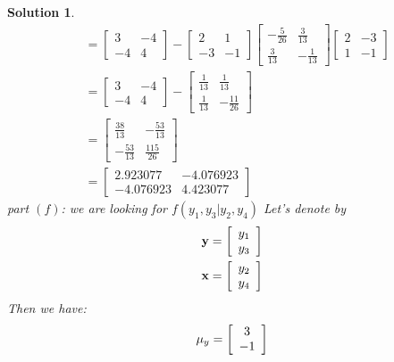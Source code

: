 \documentclass[11pt]{article}
\newtheorem{sol}{Solution}
\begin{document}
\begin{sol}
\begin{align*}
		&=  \left[\begin{array}{cc} 3&-4 \\ -4& 4\end{array}\right] - \left[\begin{array}{cc} 2& 1\\ -3&-1 \end{array}\right]\left[\begin{array}{cc} -\frac{5}{26}& \frac{3}{13}\\ \frac{3}{13}&-\frac{1}{13} \end{array}\right]\left[\begin{array}{cc}2 &-3 \\ 1& -1\end{array}\right]\\
		&=\left[\begin{array}{cc} 3&-4 \\ -4& 4\end{array}\right]  - \left[\begin{array}{cc} \frac{1}{13}& \frac{1}{13}\\ \frac{1}{13}& -\frac{11}{26}\end{array}\right]\\
		&= \left[\begin{array}{cc} \frac{38}{13}& -\frac{53}{13}\\-\frac{53}{13} &\frac{115}{26} \end{array}\right]\\
		&= \left[\begin{array}{cc}2.923077& -4.076923\\ -4.076923& 4.423077\end{array}\right]
	\end{align*}
	part $(f)$:\vskip 2mm
	we are looking for $f(y_1, y_3|y_2, y_4)$\vskip 2mm
	Let's denote by
	\begin{align*}
		{\bf y} &= \left[\begin{array}{c} y_1\\ y_3\end{array}\right]\\
		{\bf x} &= \left[\begin{array}{c} y_2\\ y_4\end{array}\right]
	\end{align*}
	Then we have:
	\begin{align*}
		{\bf \mu}_y &=  \left[\begin{array}{c} 3\\ -1\end{array}\right]\\

\end{align*}
\end{sol}
\end{document}
